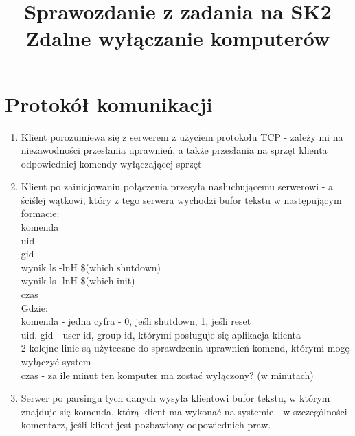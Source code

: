 \documentclass[12pt]{article}
\begin{document}
\title{Sprawozdanie z zadania na SK2\\
\large Zdalne wyłączanie komputerów}
\date{\vspace{-10ex}}
\maketitle


\section{Protokół komunikacji}
\begin {enumerate}
	\item Klient porozumiewa się z serwerem z użyciem protokołu TCP - zależy mi na niezawodności przesłania uprawnień, 
	a także przesłania na sprzęt klienta odpowiedniej komendy wyłączającej sprzęt
	\item Klient po zainicjowaniu połączenia przesyła nasłuchującemu serwerowi - a ściślej wątkowi, który z tego serwera wychodzi bufor tekstu w następującym formacie:\\
	komenda\\
	uid\\
	gid\\
	wynik ls -lnH \$(which shutdown)\\
	wynik ls -lnH \$(which init)\\
	czas\\
	Gdzie:\\
	komenda - jedna cyfra - 0, jeśli shutdown, 1, jeśli reset\\
	uid, gid - user id, group id, którymi posługuje się aplikacja klienta\\
	2 kolejne linie są użyteczne do sprawdzenia uprawnień komend, którymi mogę wyłączyć system\\
	czas - za ile minut ten komputer ma zostać wyłączony? (w minutach)
	\item Serwer po parsingu tych danych wysyła klientowi bufor tekstu, w którym znajduje się komenda, którą klient ma wykonać na systemie - w szczególności komentarz, jeśli klient jest pozbawiony odpowiednich praw.
\end {enumerate}
\end{document}
